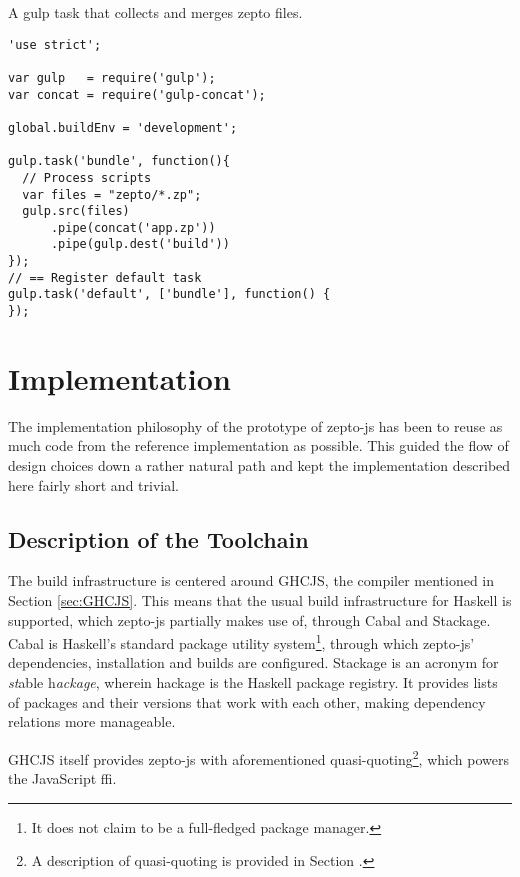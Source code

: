 \documentclass[oneside,11pt,xetex]{scrbook}
\begin{document}
\begin{listing}[H]
\caption{A gulp task that collects and merges zepto files.}
\begin{verbatim}
'use strict';

var gulp   = require('gulp');
var concat = require('gulp-concat');

global.buildEnv = 'development';

gulp.task('bundle', function(){
  // Process scripts
  var files = "zepto/*.zp";
  gulp.src(files)
      .pipe(concat('app.zp'))
      .pipe(gulp.dest('build'))
});
// == Register default task
gulp.task('default', ['bundle'], function() {
});
\end{verbatim}
\label{fig:gulp}
\end{listing}

\chapter{Implementation}
\label{chap:Implementation}

The implementation philosophy of the prototype of zepto-js has been to reuse as much
code from the reference implementation as possible. This guided the flow of design choices
down a rather natural path and kept the implementation described here fairly short and trivial.

\section{Description of the Toolchain}

The build infrastructure is centered around GHCJS, the compiler mentioned in Section \ref{sec:GHCJS}.
This means that the usual build infrastructure for Haskell is supported, which zepto-js partially
makes use of, through Cabal and Stackage. Cabal is Haskell's standard package utility
system\footnote{It does not claim to be a full-fledged package manager.}, through which
zepto-js' dependencies, installation and builds are configured. Stackage is an acronym
for \textit{st}able h\textit{ackage}, wherein hackage is the Haskell package registry.
It provides lists of packages and their versions that work with each other, making
dependency relations more manageable.

GHCJS itself provides zepto-js with aforementioned quasi-quoting\footnote{A description
of quasi-quoting is provided in Section \label{ququ}.}, which powers the JavaScript \gls{ffi}.
\end{document}
